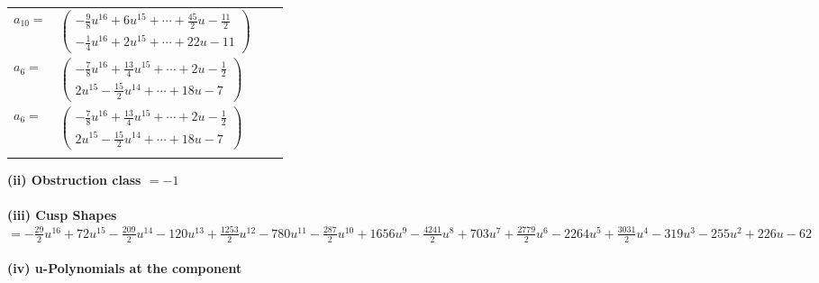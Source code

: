 \documentclass[1p]{elsarticle_modified}
\theoremstyle{definition}
\begin{document}
\begin{tabular}{m{7pt} m{180pt} m{7pt} m{180pt} }
\flushright $a_{10}=$&$\begin{pmatrix}-\frac{9}{8} u^{16}+6 u^{15}+\cdots+\frac{45}{2} u-\frac{11}{2}\\-\frac{1}{4} u^{16}+2 u^{15}+\cdots+22 u-11\end{pmatrix}$ \\
\flushright $a_{6}=$&$\begin{pmatrix}-\frac{7}{8} u^{16}+\frac{13}{4} u^{15}+\cdots+2 u-\frac{1}{2}\\2 u^{15}-\frac{15}{2} u^{14}+\cdots+18 u-7\end{pmatrix}$\\ \flushright $a_{6}=$&$\begin{pmatrix}-\frac{7}{8} u^{16}+\frac{13}{4} u^{15}+\cdots+2 u-\frac{1}{2}\\2 u^{15}-\frac{15}{2} u^{14}+\cdots+18 u-7\end{pmatrix}$\\&\end{tabular}
\flushleft \textbf{(ii) Obstruction class $= -1$}\\~\\
\flushleft \textbf{(iii) Cusp Shapes $= -\frac{29}{2} u^{16}+72 u^{15}-\frac{209}{2} u^{14}-120 u^{13}+\frac{1253}{2} u^{12}-780 u^{11}-\frac{287}{2} u^{10}+1656 u^9-\frac{4241}{2} u^8+703 u^7+\frac{2779}{2} u^6-2264 u^5+\frac{3031}{2} u^4-319 u^3-255 u^2+226 u-62$}\\~\\
\newpage\renewcommand{\arraystretch}{1}
\flushleft \textbf{(iv) u-Polynomials at the component}\newline \\
\end{document}

